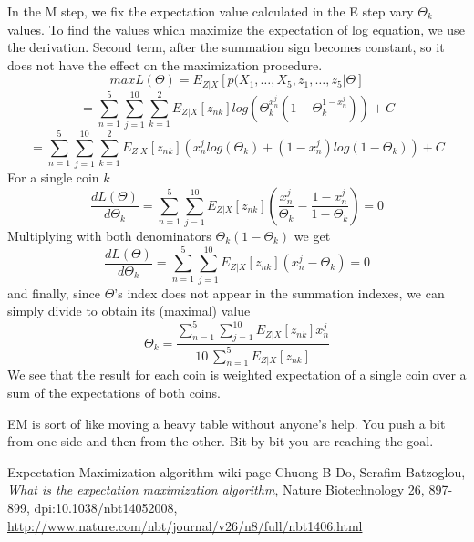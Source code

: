 \documentclass[11pt]{article}
\begin{document}
In the M step, we fix the expectation value calculated in the E step vary $\Theta_k$ values. To find the values which maximize the expectation of log equation, we use the derivation. Second term, after the summation sign becomes constant, so it does not have the effect on the maximization procedure.
\begin{equation}
maxL(\Theta)=E_{Z|X}[p(X_1,\dots, X_5,{z_1,\dots,z_5}|\Theta]
\end{equation}
\begin{equation}
=\sum_{n=1}^{5}\sum_{j=1}^{10}\sum_{k=1}^{2}E_{Z|X}[z_{nk}]log(\Theta_k^{x_n^j}(1-\Theta_k^{1-x_n^j}))+C
\end{equation}
\begin{equation}
=\sum_{n=1}^{5}\sum_{j=1}^{10}\sum_{k=1}^{2}E_{Z|X}[z_{nk}]({x_n^j}log(\Theta_k)+({1-x_n^j})log(1-\Theta_k))+C
\end{equation}
For a single coin $k$
\begin{equation}
\frac{dL(\Theta)}{d\Theta_k}=\sum_{n=1}^{5}\sum_{j=1}^{10}E_{Z|X}[z_{nk}](\frac{x_n^j}{\Theta_k}-\frac{1-x_n^j}{1-\Theta_k})=0
\end{equation}
Multiplying with both denominators $\Theta_k(1-\Theta_k)$ we get
\begin{equation}
\frac{dL(\Theta)}{d\Theta_k}=\sum_{n=1}^{5}\sum_{j=1}^{10}E_{Z|X}[z_{nk}]({x_n^j}-{\Theta_k})=0
\end{equation}
and finally, since $\Theta$'s index does not appear in the summation indexes, we can simply divide to obtain its (maximal) value
\begin{equation}
\Theta_k=\frac{\sum_{n=1}^{5}\sum_{j=1}^{10}E_{Z|X}[z_{nk}]{x_n^j}}{10\:\sum_{n=1}^{5}E_{Z|X}[z_{nk}]}
\end{equation}
We see that the result for each coin is weighted expectation of a single coin over a sum of the expectations of both coins.

EM is sort of like moving a heavy table without anyone's help. You push a bit from one side and then from the other. Bit by bit you are reaching the goal.
\begin{thebibliography}{} 
 Expectation Maximization algorithm wiki page
 Chuong B Do,  Serafim Batzoglou, \emph{What is the expectation maximization algorithm}, Nature Biotechnology 26, 897-899, dpi:10.1038/nbt14052008, \url{http://www.nature.com/nbt/journal/v26/n8/full/nbt1406.html}

\end{thebibliography}
\end{document}
